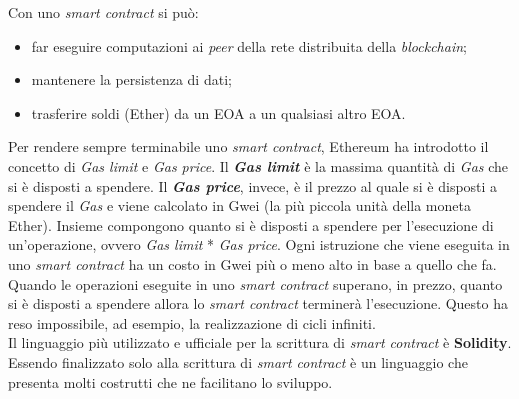 \noindent Con uno \textit{smart contract} si può:
\begin{itemize}
  \item far eseguire computazioni ai \textit{peer} della rete distribuita della \textit{blockchain};
  \item mantenere la persistenza di dati;
  \item trasferire soldi (Ether) da un EOA a un qualsiasi altro EOA.
\end{itemize}

Per rendere sempre terminabile uno \textit{smart contract}, Ethereum ha introdotto il concetto di \textit{Gas limit} e \textit{Gas price}.
Il \textbf{\textit{Gas limit}} è la massima quantità di \textit{Gas} che si è disposti a spendere. Il \textbf{\textit{Gas price}}, invece, è il prezzo al quale si è disposti a spendere il \textit{Gas} e viene calcolato in Gwei (la più piccola unità della moneta Ether). Insieme compongono quanto si è disposti a spendere per l'esecuzione di un'operazione, ovvero \textit{Gas limit} * \textit{Gas price}. Ogni istruzione che viene eseguita in uno \textit{smart contract} ha un costo in Gwei più o meno alto in base a quello che fa. Quando le operazioni eseguite in uno \textit{smart contract} superano, in prezzo, quanto si è disposti a spendere allora lo \textit{smart contract} terminerà l'esecuzione. Questo ha reso impossibile, ad esempio, la realizzazione di cicli infiniti. \\

Il linguaggio più utilizzato e ufficiale per la scrittura di \textit{smart contract} è \textbf{Solidity}. Essendo finalizzato solo alla scrittura di \textit{smart contract} è un linguaggio che presenta molti costrutti che ne facilitano lo sviluppo.


